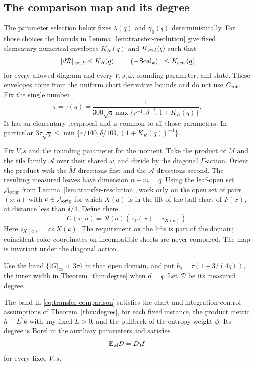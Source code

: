 \subsection{The comparison map and its degree}

The parameter selection below fixes \(\lambda(q)\) and \(\gamma_0(q)\)
deterministically.  For those choices the bounds in
Lemma~\ref{lem:transfer-resolution} give fixed elementary numerical
envelopes \(K_R(q)\) and \(K_{\rm scal}(q)\) such that
\[
 \|d\mathcal R\|_{\infty,k}\leq K_R(q),\qquad
                    (-\operatorname{Scal}_k)_+\leq K_{\rm scal}(q)
\]
for every allowed diagram and every \(V,s,\omega\), rounding parameter,
and state.  These envelopes come from the uniform chart derivative
bounds and do not use \(C_{\rm ent}\).  Fix the single number
\begin{equation}\label{eq:transfer-tau}
 \tau=\tau(q)=
 \frac{1}{300\sqrt q\max\{r^{-1},\delta^{-1},1+K_R(q)\}}.
\end{equation}
It has an elementary reciprocal and is common to all those parameters.
In particular
\(3\tau\sqrt q\leq\min\{r/100,\delta/100,(1+K_R(q))^{-1}\}\).

Fix \(V,s\) and the rounding parameter for the moment.  Take the
product of \(\widetilde M\) and the tile family \(\mathcal A\) over
their shared \(\omega\), and divide by the diagonal \(\Gamma\)-action.
Orient the product with the \(\widetilde M\) directions first and the
\(\mathcal A\) directions second.  The resulting measured leaves have
dimension \(n+m=q\).  Using the leaf-open set
\(\mathcal A_{\rm orig}\) from Lemma~\ref{lem:transfer-resolution},
work only on the open set of pairs \((x,a)\) with
\(a\in\mathcal A_{\rm orig}\) for which \(X(a)\) is in the lift of the ball chart of
\(F(x)\), at distance less than \(\delta/4\).  Define there
\begin{equation}\label{eq:transfer-comparison}
                   G(x,a)=\mathcal R(a)(z_F(x)-z_{X(a)}).
\end{equation}
Here \(z_{X(a)}=z\circ X(a)\).  The requirement on the lifts is part of
the domain; coincident color coordinates on incompatible sheets are
never compared.  The map is invariant under the diagonal action.

Use the band \(\{|G|_\infty<3\tau\}\) in that open domain, and put
\(b_q=\tau(1+3/(4q))\), the inner width in Theorem~\ref{thm:degree}
when \(d=q\).  Let \(\mathcal D\) be its measured degree.

\begin{lemma}\label{lem:transfer-degree}
The band in \eqref{eq:transfer-comparison} satisfies the chart and
integration control assumptions of Theorem~\ref{thm:degree}, for each
fixed instance, the product metric \(h+L^2k\) with any fixed \(L>0\),
and the pullback of the entropy weight \(\phi\).  Its degree is Borel
in the auxiliary parameters and satisfies
\begin{equation}\label{eq:transfer-degree}
                         \mathbb E_{\rm rd}\mathcal D=D_0I
\end{equation}
for every fixed \(V,s\).
\end{lemma}

